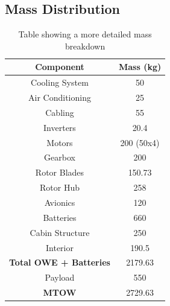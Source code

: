 \documentclass[11pt,a4paper]{article}
\begin{document}
\begin{appendices}
\renewcommand\thefigure{A.\arabic{figure}}  
\setcounter{figure}{0}
\renewcommand\theequation{A.\arabic{equation}}  
\setcounter{equation}{0}
\renewcommand\thetable{A.\arabic{table}}  
\setcounter{table}{0}
\thispagestyle{empty}
\section{Mass Distribution}
\begin{table}[H]
\centering
\caption{Table showing a more detailed mass breakdown}
\begin{tabular}{cc}
\hline
\rowcolor[HTML]{DAE8FC} 
Component                      & Mass (kg)                       \\ \hline
Cooling System                 & 50                              \\ \hline
Air Conditioning               & 25                              \\ \hline
Cabling                        & 55                              \\ \hline
Inverters                      & 20.4                            \\ \hline
Motors                         & 200 (50x4)                      \\ \hline
Gearbox                        & 200                             \\ \hline
Rotor Blades                   & 150.73                          \\ \hline
Rotor Hub                      & 258                             \\ \hline
Avionics                       & 120                             \\ \hline
Batteries                      & 660                             \\ \hline
Cabin Structure                & 250                             \\ \hline
Interior                       & 190.5                           \\ \hline
\textbf{Total OWE + Batteries} & \cellcolor[HTML]{FFCCC9}2179.63 \\ \hline
Payload                        & 550                             \\ \hline
\textbf{MTOW}                  & \cellcolor[HTML]{FFCCC9}2729.63 \\ \hline
\end{tabular}

\end{table}
\end{appendices}
\end{document}
